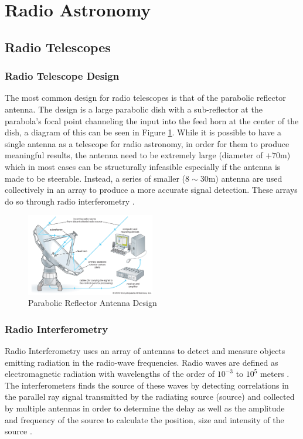 \section{Radio Astronomy}\label{ra}
\subsection{Radio Telescopes}\label{ra:sec:rt}
%
\subsubsection{Radio Telescope Design}
The most common design for radio telescopes is that of the parabolic reflector antenna. The design is a large parabolic dish with a sub-reflector at the parabola's focal point channeling the input into the feed horn at the center of the dish, a diagram of this can be seen in Figure \ref{ra:fig:para}. While it is possible to have a single antenna as a telescope for radio astronomy, in order for them to produce meaningful results, the antenna need to be extremely large (diameter of $+70$m) which in most cases can be structurally infeasible especially if the antenna is made to be steerable. Instead, a series of smaller ($8\sim30$m) antenna are used collectively in an array to produce a more accurate signal detection. These arrays do so through radio interferometry \citep{cheng2009radio}.
%
\begin{figure}[H]
	\centering
	\includegraphics[width=0.5\textwidth]{Images/Telescope.jpg}
	\caption{Parabolic Reflector Antenna Design \citep{telescope}}
	\label{ra:fig:para}
\end{figure}
%
\subsubsection{Radio Interferometry}\label{ra:ssec:des}
Radio Interferometry uses an array of antennas to detect and measure objects emitting radiation in the radio-wave frequencies. Radio waves are defined as electromagnetic radiation with wavelengths of the order of $10^{-3}$ to $10^5$ meters \citep{cheng2009radio}. The interferometers finds the source of these waves by detecting correlations in the parallel ray signal transmitted by the radiating source (source) and collected by multiple antennas in order to determine the delay as well as the amplitude and frequency of the source to calculate the position, size and intensity of the source \citep{thompson2008interferometry}.
%
